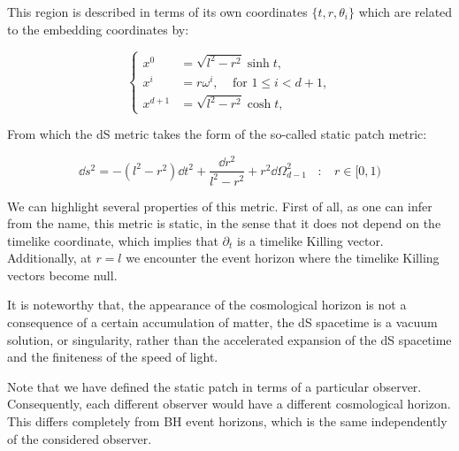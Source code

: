 \documentclass[11pt,a4paper]{article}
\begin{document}
This region is described in terms of its own coordinates $\{t,r,\theta_i\}$ which are related to the embedding coordinates by:

\begin{equation}
    \left\{
        \begin{aligned}
            x^0 &= \sqrt{l^2-r^2}\sinh t, \\
            x^i &= r\omega^i, ~~~~~\text{for }1\leq i <d+1,\\
            x^{d+1} &= \sqrt{l^2-r^2}\cosh t,
        \end{aligned}
    \right.
\end{equation}

From which the dS metric takes the form of the so-called static patch metric:

\begin{equation}
    \dd s^2 = -(l^2-r^2)\dd t^2 + \frac{\dd r^2}{l^2-r^2} + r^2\dd\Omega^2_{d-1} ~~~~:~~~~ r\in[0,1)
\end{equation}

We can highlight several properties of this metric. First of all, as one can infer from the name, this metric is static, in the sense that it does not depend on the timelike coordinate, which implies that $\partial_t$ is a timelike Killing vector. Additionally, at $r=l$ we encounter the event horizon where the timelike Killing vectors become null. 

It is noteworthy that, the appearance of the cosmological horizon is not a consequence of a certain accumulation of matter, the dS spacetime is a vacuum solution, or singularity, rather than the accelerated expansion of the dS spacetime and the finiteness of the speed of light. 

Note that we have defined the static patch in terms of a particular observer. Consequently, each different observer would have a different cosmological horizon. This differs completely from BH event horizons, which is the same independently of the considered observer.
\end{document}
